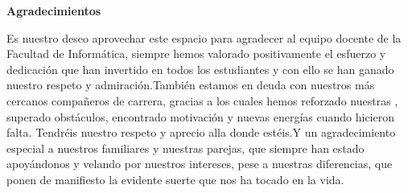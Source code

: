 
\newpage
\begin{center}
{\bf \Huge Agradecimientos}
\end{center}
\vspace{1cm}
\setlength{\baselineskip}{0.8cm}



Es nuestro deseo aprovechar este espacio para agradecer al equipo docente de la Facultad de Informática, siempre hemos valorado positivamente el esfuerzo y dedicación que han invertido en todos los estudiantes y con ello se han ganado nuestro respeto y admiración.También estamos en deuda con nuestros más cercanos compañeros de carrera, gracias a los cuales hemos reforzado nuestras , superado obstáculos, encontrado motivación y nuevas energías cuando hicieron falta. Tendréis nuestro respeto y aprecio alla donde estéis.Y un agradecimiento especial a nuestros familiares y nuestras parejas, que siempre han estado apoyándonos y velando por nuestros intereses, pese a nuestras diferencias, que ponen de manifiesto la evidente suerte que nos ha tocado en la vida. 

